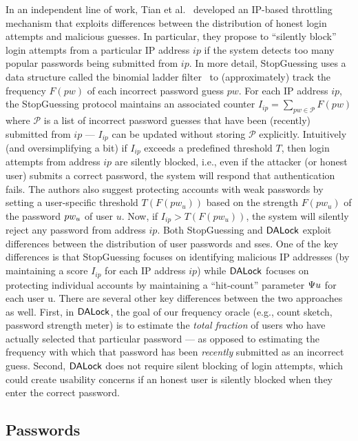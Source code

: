  In an independent line of work, Tian et al.~\cite{EuroSP:THS19} developed an IP-based throttling mechanism that exploits differences between the distribution of honest login attempts and malicious guesses. In particular, they propose to ``silently block'' login attempts from a particular IP address $ip$ if the system detects too many popular passwords being submitted from $ip$. In more detail, StopGuessing uses a data structure called the binomial ladder filter~\cite{SchHer:MSR18} to (approximately) track the frequency $F(pw)$ of each incorrect password guess $pw$. For each IP address $ip$, the StopGuessing protocol maintains an associated counter $I_{ip} = \displaystyle{\sum_{pw \in \mathcal{P}} F(pw)}$ where $\mathcal{P}$ is a list of incorrect password guesses that have been (recently) submitted from $ip$ --- $I_{ip} $ can be updated without storing $\mathcal{P}$ explicitly. Intuitively (and oversimplifying a bit) if $I_{ip}$ exceeds a predefined threshold $T$, then login attempts from address $ip$ are silently blocked, i.e., even if the attacker (or honest user) submits a correct password, the system will respond that authentication fails. The authors also suggest protecting accounts with weak passwords by setting a user-specific threshold $T(F(pw_{u}))$ based on the strength $F(pw_{u})$ of the password $pw_{u}$ of user $u$. Now, if $I_{ip} > T(F(pw_{u}))$, the system will silently reject any password from address $ip$. Both StopGuessing and $\mathsf{DALock}$ exploit differences between the distribution of user passwords and sses. One of the key differences is that StopGuessing focuses on identifying malicious IP addresses (by maintaining a score $I_{ip}$ for each IP address $ip$) while $\mathsf{DALock}$ focuses on protecting individual accounts by maintaining a ``hit-count'' parameter $\Psi{u}$ for each user u. There are several other key differences between the two approaches as well. First, in $\mathsf{DALock}$, the goal of our frequency oracle (e.g., count sketch, password strength meter) is to estimate the \textit{total fraction} of users who have actually selected that particular password --- as opposed to estimating the frequency with which that password has been {\em recently} submitted as an incorrect guess. Second, $\mathsf{DALock}$ does not require silent blocking of login attempts, which could create usability concerns if an honest user is silently blocked when they enter the correct password.  

\vspace{-0.2cm}
\subsection{Passwords} \label{related: Passwords}  

